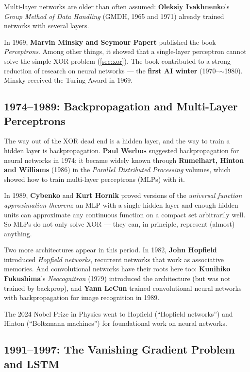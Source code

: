 \documentclass[11pt, oneside]{book}
\let\originalsubsection\subsection
\renewcommand{\subsection}{\Needspace{6\baselineskip}\originalsubsection}
\begin{document}
Multi-layer networks are older than often assumed: \textbf{Oleksiy
Ivakhnenko}'s \emph{Group Method of Data Handling} (GMDH, 1965 and 1971)
already trained networks with several layers.

In 1969, \textbf{Marvin Minsky and Seymour Papert} published the book
\emph{Perceptrons}. Among other things, it showed that a single-layer
perceptron cannot solve the simple XOR problem (\cref{sec:xor}). The book
contributed to a strong reduction of research on neural networks --- the
\textbf{first AI winter} (1970--$\sim$1980). Minsky received the Turing Award
in 1969.

\subsection{1974--1989: Backpropagation and Multi-Layer Perceptrons}

The way out of the XOR dead end is a hidden layer, and the way to train a
hidden layer is backpropagation. \textbf{Paul Werbos} suggested
backpropagation for neural networks in 1974; it became widely known through
\textbf{Rumelhart, Hinton and Williams} (1986) in the \emph{Parallel
Distributed Processing} volumes, which showed how to train multi-layer
perceptrons (MLPs) with it.

In 1989, \textbf{Cybenko} and \textbf{Kurt Hornik} proved versions of the
\emph{universal function approximation theorem}: an MLP with a single hidden
layer and enough hidden units can approximate any continuous function on a
compact set arbitrarily well. So MLPs do not only solve XOR --- they can, in
principle, represent (almost) anything.

Two more architectures appear in this period. In 1982, \textbf{John Hopfield}
introduced \emph{Hopfield networks}, recurrent networks that work as
associative memories. And convolutional networks have their roots here too:
\textbf{Kunihiko Fukushima}'s \emph{Neocognitron} (1979) introduced the
architecture (but was not trained by backprop), and \textbf{Yann LeCun}
trained convolutional neural networks with backpropagation for image
recognition in 1989.

The 2024 Nobel Prize in Physics went to Hopfield (``Hopfield networks'') and
Hinton (``Boltzmann machines'') for foundational work on neural networks.

\subsection{1991--1997: The Vanishing Gradient Problem and LSTM}
\end{document}
